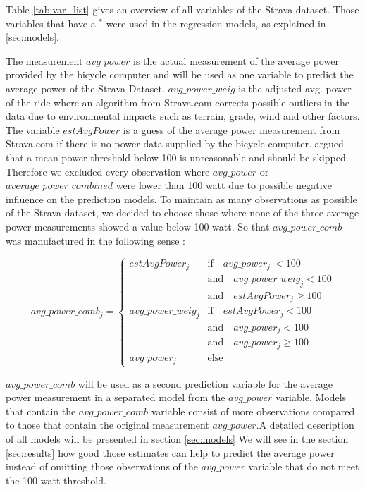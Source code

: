 \documentclass[12pt,a4paper]{article}
\begin{document}
Table \ref{tab:var_list} gives an overview of all variables of the Strava dataset. Those variables that have a \(^*\) were used in the regression models, as explained in \ref{sec:models}.

The measurement \(avg\_power\) is the actual measurement of the average power provided by the bicycle computer and will be used as one variable to predict the average power of the Strava Dataset. \(avg\_power\_weig\) is the adjusted avg. power of the ride where an algorithm from Strava.com corrects possible outliers in the data due to environmental impacts such as terrain, grade, wind and other factors. The variable \(estAvgPower\) is a guess of the average power measurement from Strava.com if there is no power data supplied by the bicycle computer. \textcite{Karetnikov2019} argued that a mean power threshold below 100 is unreasonable and should be skipped. Therefore we excluded every observation where \(avg\_power\) or \(average\_power\_combined\) were lower than 100 watt due to possible negative influence on the prediction models. To maintain as many observations as possible of the Strava dataset, we decided to choose those where none of the three average power measurements showed a value below 100 watt. So that \(avg\_power\_comb\) was manufactured in the following sense :

\begin{equation}
avg\_power\_comb_j = 
\begin{cases}
 estAvgPower_j & \mbox{if} \quad  avg\_power_j \ < 100\\  & \mbox{and} \quad avg\_power\_weig_j < 100 \\ & \mbox{and}\quad estAvgPower_j \geq 100  \\
avg\_power\_weig_j & \mbox{if} \quad estAvgPower_j < 100 \\  & \mbox{and} \quad  avg\_power_j  < 100 \\ &  \mbox{and}\quad avg\_power_j \geq 100 \\
avg\_power_j  &  \mbox{else}   
\end{cases}
\label{eq:avg_power_comb}
\end{equation}

\(avg\_power\_comb\) will be used as a second prediction variable for the average power measurement in a separated model from the \(avg\_power\) variable. Models that contain the \(avg\_power\_comb\) variable consist of more observations compared to those that contain the original measurement \(avg\_power\).A detailed description of all models will be presented in section \ref{sec:models} We will see in the section \ref{sec:results} how good those estimates can help to predict the average power instead of omitting those observations of the \(avg\_power\) variable that do not meet the 100 watt threshold.
\end{document}
